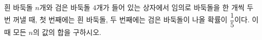 흰 바둑돌 $n$개와 검은 바둑돌 $4$개가 들어 있는 상자에서 임의로 바둑돌을 한 개씩 두 번 꺼낼 때, 첫 번째에는 흰 바둑돌, 두 번째에는 검은 바둑돌이 나올 확률이 $\dfrac{1}{5}$이다. 이때 모든 $n$의 값의 합을 구하시오. 
